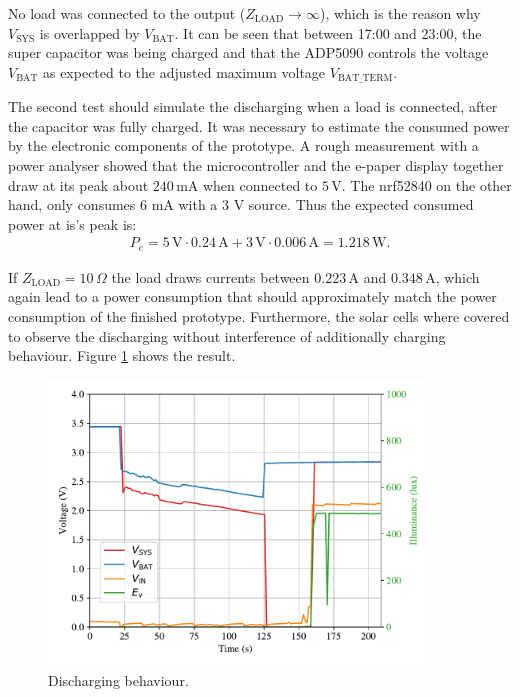 No load was connected to the output ($Z_\text{LOAD} \to \infty$), which is the reason why $V_{\text{SYS}}$ is overlapped by $V_{\text{BAT}}$.
It can be seen that between 17:00 and 23:00, the super capacitor was being charged and
that the ADP5090 controls the voltage $V_{\text{BAT}}$ as expected to the adjusted maximum voltage $V_{\text{BAT\_TERM}}$.

The second test should simulate the discharging when a load is connected, after the capacitor was fully charged.
It was necessary to estimate the consumed power by the electronic components of the prototype.
A rough measurement with a power analyser showed that the microcontroller and the e-paper display together draw at its peak about $240\,\text{mA}$ when connected to $5\,\text{V}$. The nrf52840 on the other hand, only consumes 6 mA with a 3 V source. Thus the expected consumed power at is's peak is:
\begin{align}
	P_{e} = 5\,\text{V}\cdot 0.24\,\text{A} + 3\,\text{V}\cdot 0.006\,\text{A} = 1.218\,\text{W}.
\end{align}
  

If $Z_{\text{LOAD}}=10\,\Omega$ the load draws currents between $0.223\,\text{A}$ and $0.348\,\text{A}$, which again lead to a power consumption that should approximately match the power consumption of the finished prototype.
Furthermore, the solar cells where covered to observe the discharging without interference of additionally charging behaviour.
Figure \ref{development:discharge} shows the result.
 
\begin{figure}[ht]
	\centering
	\includegraphics[width=0.9\textwidth]{4-development/hardware/graphics/entladen.pdf}
	\caption{Discharging behaviour.\label{development:discharge}}
\end{figure}

